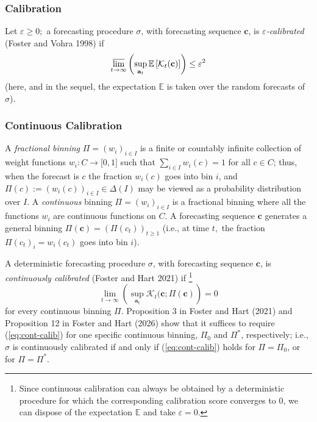 \documentclass[12pt,a4paper,notitlepage]{article}
\begin{document}
\subsubsection{Calibration\label{susus:calibration}}

Let $\varepsilon \geq 0;$ a forecasting procedure $\sigma $, with
forecasting sequence $\mathbf{c}$, is $\varepsilon $\emph{-calibrated}
(Foster and Vohra 1998) if%
\begin{equation*}
\varlimsup_{t\rightarrow \infty }\left( \sup_{\mathbf{a}_{t}}\mathbb{E}\left[
\mathcal{K}_{t}(\mathbf{c})\right] \right) \leq \varepsilon ^{2}
\end{equation*}%
(here, and in the sequel, the expectation $\mathbb{E}$ is taken over the
random forecasts of $\sigma $).

\subsubsection{Continuous Calibration\label{susus:continuous calibration}}

A \emph{fractional binning} $\Pi =(w_{i})_{i\in I}$ is a finite or countably
infinite collection of weight functions $w_{i}:C\rightarrow \lbrack 0,1]$
such that $\sum_{i\in I}w_{i}(c)=1$ for all $c\in C$; thus, when the
forecast is $c$ the fraction $w_{i}(c)$ goes into bin $i$, and $\Pi
(c):=(w_{i}(c))_{i\in I}\in \Delta (I)$ may be viewed as a probability
distribution over $I$. A \emph{continuous} binning $\Pi =(w_{i})_{i\in I}$
is a fractional binning where all the functions $w_{i}$ are continuous
functions on $C$. A forecasting sequence $\mathbf{c}$ generates a general
binning $\Pi (\mathbf{c})=(\Pi (c_{t}))_{t\geq 1}$ (i.e., at time $t,$ the
fraction $\Pi (c_{t})_{i}=w_{i}(c_{t})$ goes into bin $i$).

A deterministic forecasting procedure $\sigma $, with forecasting sequence $%
\mathbf{c}$, is \emph{continuously calibrated} (Foster and Hart 2021) if%
\footnote{%
Since continuous calibration can always be obtained by a deterministic
procedure for which the corresponding calibration score converges to $0$, we
can dispose of the expectation $\mathbb{E}$ and take $\varepsilon =0$.}%
\begin{equation}
\lim_{t\rightarrow \infty }\left( \sup_{\mathbf{a}_{t}}\mathcal{K}_{t}(%
\mathbf{c};\Pi (\mathbf{c})\right) =0  \label{eq:cont-calib}
\end{equation}%
for every continuous binning $\Pi $. Proposition 3 in Foster and Hart (2021)
and Proposition 12 in Foster and Hart (2026) show that it suffices to
require (\ref{eq:cont-calib}) for one specific continuous binning, $\Pi _{0}$
and $\Pi ^{\ast }$, respectively; i.e., $\sigma $ is continuously calibrated
if and only if (\ref{eq:cont-calib}) holds for $\Pi =\Pi _{0}$, or for $\Pi
=\Pi ^{\ast }$.
\end{document}
